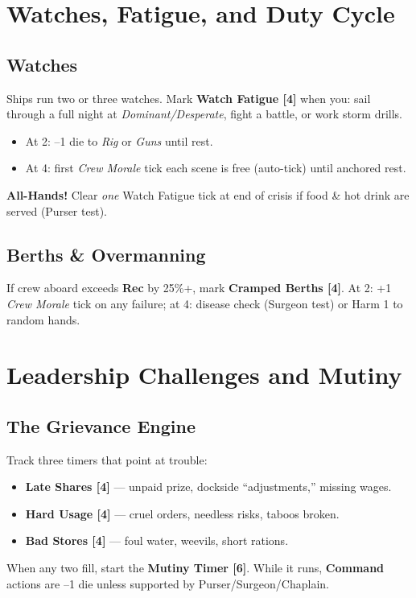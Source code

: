 \documentclass[11pt,oneside]{book}
\begin{document}
\section{Watches, Fatigue, and Duty Cycle}

\subsection*{Watches}
Ships run two or three watches. Mark \textbf{Watch Fatigue [4]} when you: sail through a full night at \emph{Dominant/Desperate}, fight a battle, or work storm drills.
\begin{itemize}
  \item At 2: --1 die to \emph{Rig} or \emph{Guns} until rest.
  \item At 4: first \textit{Crew Morale} tick each scene is free (auto-tick) until anchored rest.
\end{itemize}
\noindent \textbf{All-Hands!} Clear \emph{one} Watch Fatigue tick at end of crisis if food \& hot drink are served (Purser test).

\subsection*{Berths \& Overmanning}
If crew aboard exceeds \textbf{Rec} by 25\%+, mark \textbf{Cramped Berths [4]}. At 2: +1 \textit{Crew Morale} tick on any failure; at 4: disease check (Surgeon test) or Harm 1 to random hands.

\section{Leadership Challenges and Mutiny}

\subsection*{The Grievance Engine}
Track three timers that point at trouble:
\begin{itemize}
  \item \textbf{Late Shares [4]} --- unpaid prize, dockside ``adjustments,'' missing wages.
  \item \textbf{Hard Usage [4]} --- cruel orders, needless risks, taboos broken.
  \item \textbf{Bad Stores [4]} --- foul water, weevils, short rations.
\end{itemize}
\noindent When any two fill, start the \textbf{Mutiny Timer [6]}. While it runs, \textbf{Command} actions are --1 die unless supported by Purser/Surgeon/Chaplain.
\end{document}
